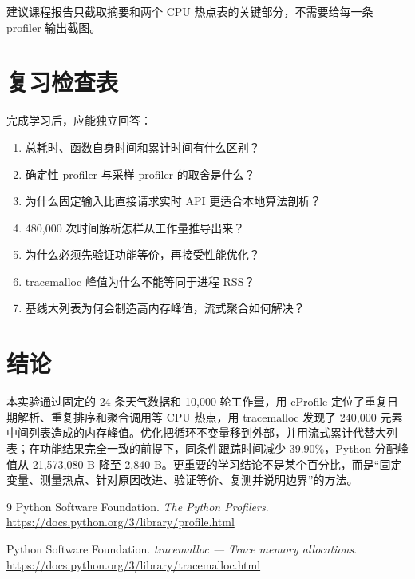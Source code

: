 \documentclass[UTF8,zihao=-4,a4paper]{ctexart}
\begin{document}
建议课程报告只截取摘要和两个 CPU 热点表的关键部分，不需要给每一条 profiler 输出截图。

\section{复习检查表}

完成学习后，应能独立回答：

\begin{enumerate}
  \item 总耗时、函数自身时间和累计时间有什么区别？
  \item 确定性 profiler 与采样 profiler 的取舍是什么？
  \item 为什么固定输入比直接请求实时 API 更适合本地算法剖析？
  \item 480,000 次时间解析怎样从工作量推导出来？
  \item 为什么必须先验证功能等价，再接受性能优化？
  \item tracemalloc 峰值为什么不能等同于进程 RSS？
  \item 基线大列表为何会制造高内存峰值，流式聚合如何解决？
\end{enumerate}

\section{结论}

本实验通过固定的 24 条天气数据和 10,000 轮工作量，用 cProfile 定位了重复日期解析、重复排序和聚合调用等 CPU 热点，用 tracemalloc 发现了 240,000 元素中间列表造成的内存峰值。优化把循环不变量移到外部，并用流式累计代替大列表；在功能结果完全一致的前提下，同条件跟踪时间减少 39.90\%，Python 分配峰值从 21,573,080 B 降至 2,840 B。更重要的学习结论不是某个百分比，而是“固定变量、测量热点、针对原因改进、验证等价、复测并说明边界”的方法。

\begin{thebibliography}{9}
Python Software Foundation. \emph{The Python Profilers}.\\
\url{https://docs.python.org/3/library/profile.html}

Python Software Foundation. \emph{tracemalloc --- Trace memory allocations}.\\
\url{https://docs.python.org/3/library/tracemalloc.html}
\end{thebibliography}
\end{document}
